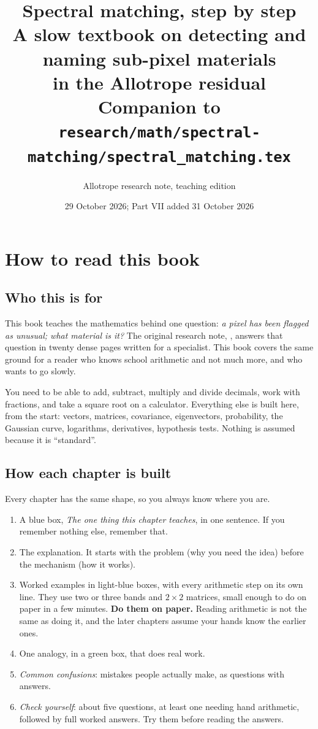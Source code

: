 \documentclass[11pt,a4paper,oneside,openany]{book}
\title{\textbf{Spectral matching, step by step}\\[6pt]
  \large A slow textbook on detecting and naming sub-pixel materials\\ in the Allotrope residual\\[10pt]
  \normalsize Companion to \texttt{research/math/spectral-matching/spectral\_matching.tex}}
\author{Allotrope research note, teaching edition}
\date{29 October 2026; Part VII added 31 October 2026}
\begin{document}
\frontmatter
{}
\maketitle
{}
\tableofcontents
\chapter*{How to read this book}

\section*{Who this is for}

This book teaches the mathematics behind one question: \emph{a pixel has been flagged as unusual; what material is
it?} The original research note, , answers that question
in twenty dense pages written for a specialist. This book covers the same ground for a reader who knows school
arithmetic and not much more, and who wants to go slowly.

You need to be able to add, subtract, multiply and divide decimals, work with fractions, and take a square root on a
calculator. Everything else is built here, from the start: vectors, matrices, covariance, eigenvectors, probability,
the Gaussian curve, logarithms, derivatives, hypothesis tests. Nothing is assumed because it is ``standard''.

\section*{How each chapter is built}

Every chapter has the same shape, so you always know where you are.
\begin{enumerate}
\item A blue box, \emph{The one thing this chapter teaches}, in one sentence. If you remember nothing else, remember
that.
\item The explanation. It starts with the problem (why you need the idea) before the mechanism (how it works).
\item Worked examples in light-blue boxes, with every arithmetic step on its own line. They use two or three bands
and $2\times2$ matrices, small enough to do on paper in a few minutes. \textbf{Do them on paper.} Reading arithmetic is
not the same as doing it, and the later chapters assume your hands know the earlier ones.
\item One analogy, in a green box, that does real work.
\item \emph{Common confusions}: mistakes people actually make, as questions with answers.
\item \emph{Check yourself}: about five questions, at least one needing hand arithmetic, followed by full worked
answers. Try them before reading the answers.
\end{enumerate}
\end{document}
